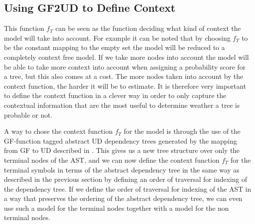 \subsection{Using GF2UD to Define Context}
This function $f_T$ can be seen as the function deciding what kind of context the model will take into account. For example it can be noted that by choosing $f_T$ to be the constant mapping to the empty set the model will be reduced to a completely context free model. If we take more nodes into account the model will be able to take more context into account when assigning a probability score for a tree, but this also comes at a cost. The more nodes taken into account by the context function, the harder it will be to estimate. It is therefore very important to define the context function in a clever way in order to only capture the contextual information that are the most useful to determine weather a tree is probable or not.

A way to chose the context function $f_T$ for the model is through the use of the GF-function tagged abstract UD dependency trees generated by the mapping from GF to UD described in \citep{kolachina2016gf2ud}. This gives us a new tree structure over only the terminal nodes of the AST, and we can now define the context function $f_T$ for the terminal symbols in terms of the abstract dependency tree in the same way as described in the previous section by defining an order of traversal for indexing of the dependency tree. If we define the order of traversal for indexing of the AST in a way that preserves the ordering of the abstract dependency tree, we can even use such a model for the terminal nodes together with a model for the non terminal nodes.
